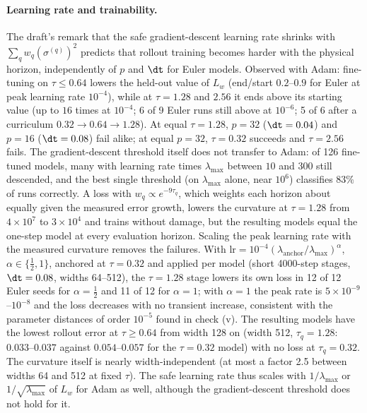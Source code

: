 \paragraph{Learning rate and trainability.}
The draft's remark that the safe gradient-descent learning rate shrinks with $\sum_q w_q(\sigma^{(q)})^2$ predicts that rollout training becomes harder with the physical horizon, independently of $p$ and $\dt$ for Euler models.
Observed with Adam:
fine-tuning on $\tau\le0.64$ lowers the held-out value of $L_w$ (end/start $0.2$--$0.9$ for Euler at peak learning rate $10^{-4}$), while at $\tau = 1.28$ and $2.56$ it ends above its starting value (up to $16$ times at $10^{-4}$; 6 of 9 Euler runs still above at $10^{-6}$; 5 of 6 after a curriculum $0.32\to0.64\to1.28$).
At equal $\tau = 1.28$, $p = 32$ ($\dt = 0.04$) and $p = 16$ ($\dt = 0.08$) fail alike; at equal $p = 32$, $\tau = 0.32$ succeeds and $\tau = 2.56$ fails.
The gradient-descent threshold itself does not transfer to Adam: of 126 fine-tuned models, many with learning rate times $\lambda_{\max}$ between $10$ and $300$ still descended, and the best single threshold (on $\lambda_{\max}$ alone, near $10^6$) classifies $83\%$ of runs correctly.
A loss with $w_q\propto e^{-9\tau_q}$, which weights each horizon about equally given the measured error growth, lowers the curvature at $\tau = 1.28$ from $4\times10^7$ to $3\times10^4$ and trains without damage, but the resulting models equal the one-step model at every evaluation horizon.
Scaling the peak learning rate with the measured curvature removes the failures.
With $\mathrm{lr} = 10^{-4}(\lambda_{\mathrm{anchor}}/\lambda_{\max})^{\alpha}$, $\alpha\in\{\tfrac12, 1\}$, anchored at $\tau = 0.32$ and applied per model (short 4000-step stages, $\dt = 0.08$, widths 64--512), the $\tau = 1.28$ stage lowers its own loss in 12 of 12 Euler seeds for $\alpha=\tfrac12$ and 11 of 12 for $\alpha = 1$; with $\alpha = 1$ the peak rate is $5\times10^{-9}$--$10^{-8}$ and the loss decreases with no transient increase, consistent with the parameter distances of order $10^{-5}$ found in check (v).
The resulting models have the lowest rollout error at $\tau\ge0.64$ from width 128 on (width 512, $\tau_q = 1.28$: $0.033$--$0.037$ against $0.054$--$0.057$ for the $\tau = 0.32$ model) with no loss at $\tau_q = 0.32$.
The curvature itself is nearly width-independent (at most a factor 2.5 between widths 64 and 512 at fixed $\tau$).
The safe learning rate thus scales with $1/\lambda_{\max}$ or $1/\sqrt{\lambda_{\max}}$ of $L_w$ for Adam as well, although the gradient-descent threshold does not hold for it.

